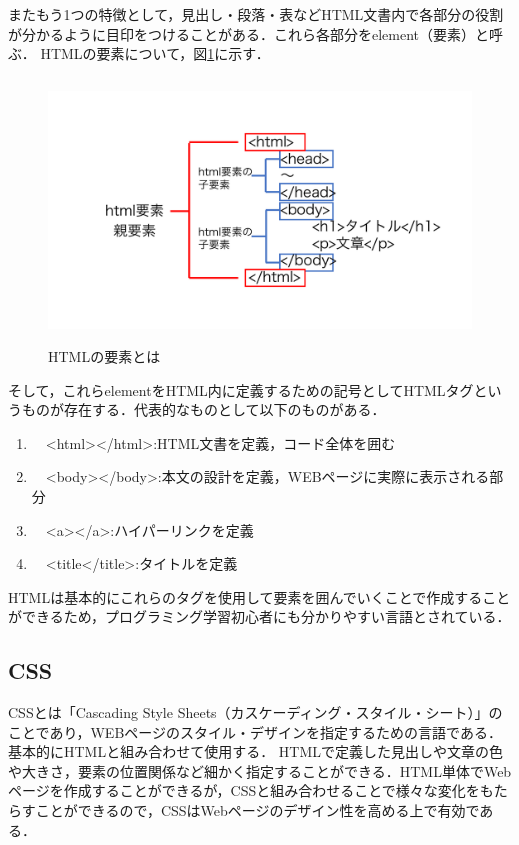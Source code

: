 \documentclass[12pt,a4j]{ltjsarticle}
\begin{document}
またもう1つの特徴として，見出し・段落・表などHTML文書内で各部分の役割が分かるように目印をつけることがある．これら各部分をelement（要素）と呼ぶ．
HTMLの要素について，図\ref{fig:html_elem}に示す．
\begin{figure}[h]
\begin{center}
\includegraphics[height = 70mm ] {figures/html_ele.pdf}
\caption{HTMLの要素とは}
\label{fig:html_elem}
\end{center}
\end{figure}

\clearpage

そして，これらelementをHTML内に定義するための記号としてHTMLタグというものが存在する．代表的なものとして以下のものがある．
\begin{enumerate}[label=(\roman*)]
	\item　<html></html>:HTML文書を定義，コード全体を囲む
	\item　<body></body>:本文の設計を定義，WEBページに実際に表示される部分
	\item　<a></a>:ハイパーリンクを定義
	\item　<title</title>:タイトルを定義
\end{enumerate}

HTMLは基本的にこれらのタグを使用して要素を囲んでいくことで作成することができるため，プログラミング学習初心者にも分かりやすい言語とされている．
\clearpage

\subsection{CSS}
CSSとは「Cascading Style Sheets（カスケーディング・スタイル・シート）」のことであり，WEBページのスタイル・デザインを指定するための言語である\cite{css}．
基本的にHTMLと組み合わせて使用する．
HTMLで定義した見出しや文章の色や大きさ，要素の位置関係など細かく指定することができる．HTML単体でWebページを作成することができるが，CSSと組み合わせることで様々な変化をもたらすことができるので，CSSはWebページのデザイン性を高める上で有効である．
\end{document}
